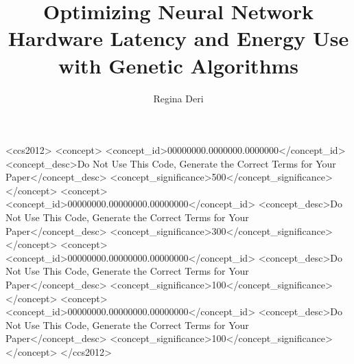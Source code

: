 \documentclass[sigconf]{acmart}
\begin{document}
\title{Optimizing Neural Network Hardware Latency and Energy Use with Genetic Algorithms}

\author{Regina Deri}



\renewcommand{\shortauthors}{Regina Deri}

  

\iffalse
\begin{CCSXML}
<ccs2012>
 <concept>
  <concept_id>00000000.0000000.0000000</concept_id>
  <concept_desc>Do Not Use This Code, Generate the Correct Terms for Your Paper</concept_desc>
  <concept_significance>500</concept_significance>
 </concept>
 <concept>
  <concept_id>00000000.00000000.00000000</concept_id>
  <concept_desc>Do Not Use This Code, Generate the Correct Terms for Your Paper</concept_desc>
  <concept_significance>300</concept_significance>
 </concept>
 <concept>
  <concept_id>00000000.00000000.00000000</concept_id>
  <concept_desc>Do Not Use This Code, Generate the Correct Terms for Your Paper</concept_desc>
  <concept_significance>100</concept_significance>
 </concept>
 <concept>
  <concept_id>00000000.00000000.00000000</concept_id>
  <concept_desc>Do Not Use This Code, Generate the Correct Terms for Your Paper</concept_desc>
  <concept_significance>100</concept_significance>
 </concept>
</ccs2012>
\end{CCSXML}
\end{document}
